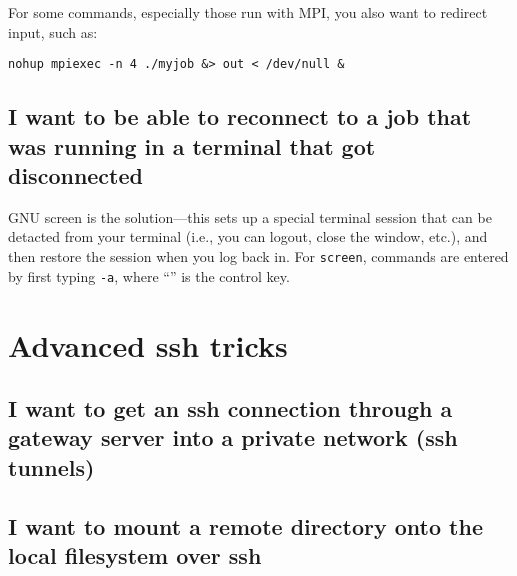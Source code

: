 For some commands, especially those run with MPI, you also want to redirect
input, such as:

\begin{verbatim}
nohup mpiexec -n 4 ./myjob &> out < /dev/null &
\end{verbatim}

\subsection{I want to be able to reconnect to a job that was running in a
terminal that got disconnected}

GNU screen is the solution---this sets up a special terminal session that can
be detacted from your terminal (i.e., you can logout, close the window, etc.),
and then restore the session when you log back in. For {\tt screen}, commands
are entered by first typing {\tt \carat-a}, where ``{\tt \carat}'' is the
control key.

\section{Advanced ssh tricks}

\subsection{I want to get an ssh connection through a gateway server into a
private network (ssh tunnels)}

\subsection{I want to mount a remote directory onto the local filesystem over
ssh}
